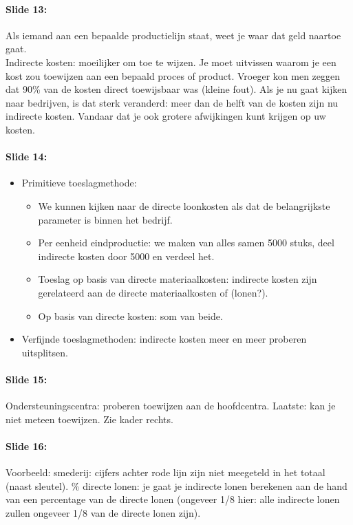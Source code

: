 \documentclass[10pt,a4paper]{report}
\begin{document}
\paragraph{Slide 13:} Als iemand aan een bepaalde productielijn staat, weet je waar dat geld naartoe gaat. \\
Indirecte kosten: moeilijker om toe te wijzen. Je moet uitvissen waarom je een kost zou toewijzen aan een bepaald proces of product. Vroeger kon men zeggen dat 90\% van de kosten direct toewijsbaar was (kleine fout). Als je nu gaat kijken naar bedrijven, is dat sterk veranderd: meer dan de helft van de kosten zijn nu indirecte kosten. Vandaar dat je ook grotere afwijkingen kunt krijgen op uw kosten.

\paragraph{Slide 14:}
\begin{itemize}
\item Primitieve toeslagmethode:
\begin{itemize}
\item We kunnen kijken naar de directe loonkosten als dat de belangrijkste parameter is binnen het bedrijf. 
\item Per eenheid eindproductie: we maken van alles samen 5000 stuks, deel indirecte kosten door 5000 en verdeel het.
\item Toeslag op basis van directe materiaalkosten: indirecte kosten zijn gerelateerd aan de directe materiaalkosten of (lonen?).
\item Op basis van directe kosten: som van beide.
\end{itemize}
\item Verfijnde toeslagmethoden: indirecte kosten meer en meer proberen uitsplitsen.
\end{itemize}

\paragraph{Slide 15:} Ondersteuningscentra: proberen toewijzen aan de hoofdcentra. Laatste: kan je niet meteen toewijzen. Zie kader rechts.

\paragraph{Slide 16:} Voorbeeld: smederij: cijfers achter rode lijn zijn niet meegeteld in het totaal (naast sleutel).
\% directe lonen: je gaat je indirecte lonen berekenen aan de hand van een percentage van de directe lonen (ongeveer 1/8 hier: alle indirecte lonen zullen ongeveer 1/8 van de directe lonen zijn).
\end{document}
